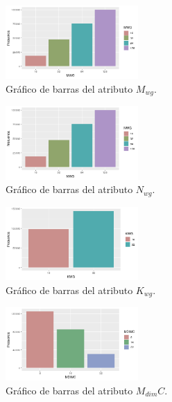 \documentclass[osajnl,twocolumn,showpacs,superscriptaddress,10pt]{revtex4-1} %
\begin{document}
\begin{figure}[H]
    \centering
    \includegraphics[width=0.45\textwidth]{plots/mwg_bar}
    \caption{Gráfico de barras del atributo $M_{wg}$.}
    \label{figure:mwg_bar}
\end{figure}

\begin{figure}[H]
    \centering
    \includegraphics[width=0.45\textwidth]{plots/nwg_bar}
    \caption{Gráfico de barras del atributo $N_{wg}$.}
    \label{figure:nwg_bar}
\end{figure}

\begin{figure}[H]
    \centering
    \includegraphics[width=0.45\textwidth]{plots/kwg_bar}
    \caption{Gráfico de barras del atributo $K_{wg}$.}
    \label{figure:kwg_bar}
\end{figure}

\begin{figure}[H]
    \centering
    \includegraphics[width=0.45\textwidth]{plots/mdimc_bar}
    \caption{Gráfico de barras del atributo $M_{dim}C$.}
    \label{figure:MDIMC_bar}
\end{figure}
\end{document}
